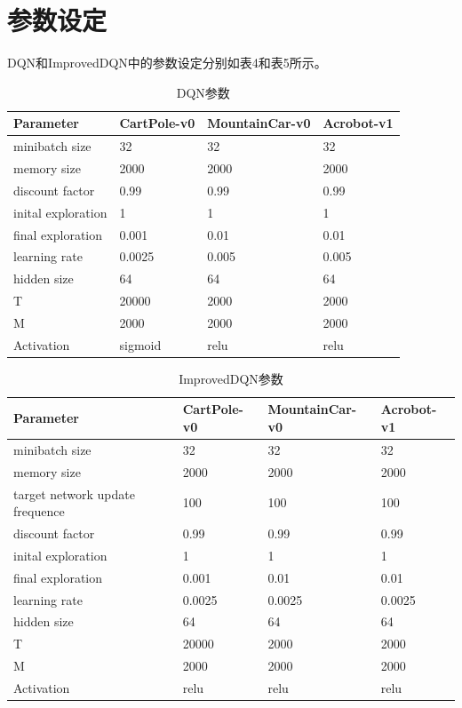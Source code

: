 \documentclass[a4paper,UTF8]{article}
\theoremstyle{definition}
\begin{document}
\section*{参数设定}
	DQN和ImprovedDQN中的参数设定分别如表4和表5所示。
\begin{table}[!h]
\caption{DQN参数}  
\centering
\begin{tabular*}{14cm}{llll}  
\hline  
Parameter & CartPole-v0 & MountainCar-v0 & Acrobot-v1 \\  
\hline 
 minibatch size  & 32 & 32 & 32 \\ 
 memory size & 2000 & 2000 & 2000 \\
 discount factor & 0.99 & 0.99 & 0.99 \\
 inital exploration & 1 & 1 & 1 \\
 final exploration & 0.001 & 0.01 & 0.01 \\
 learning rate & 0.0025 & 0.005 & 0.005 \\
 hidden size & 64 & 64 & 64 \\
 T & 20000 & 2000 & 2000 \\
 M & 2000 & 2000 & 2000 \\
 Activation & sigmoid & relu & relu \\
\hline  
\end{tabular*}  
\end{table} 

\begin{table}[!h]
\caption{ImprovedDQN参数}  
\centering
\begin{tabular*}{14cm}{llll}  
\hline  
Parameter & CartPole-v0 & MountainCar-v0 & Acrobot-v1 \\  
\hline 
 minibatch size  & 32 & 32 & 32 \\ 
 memory size & 2000 & 2000 & 2000 \\
 target network update frequence & 100 & 100 & 100 \\ 
 discount factor & 0.99 & 0.99 & 0.99 \\
 inital exploration & 1 & 1 & 1 \\
 final exploration & 0.001 & 0.01 & 0.01 \\
 learning rate & 0.0025 & 0.0025 & 0.0025 \\
 hidden size & 64 & 64 & 64 \\
 T & 20000 & 2000 & 2000 \\
 M & 2000 & 2000 & 2000 \\
 Activation & relu & relu & relu \\
\hline  
\end{tabular*}  
\end{table} 



\end{document}
